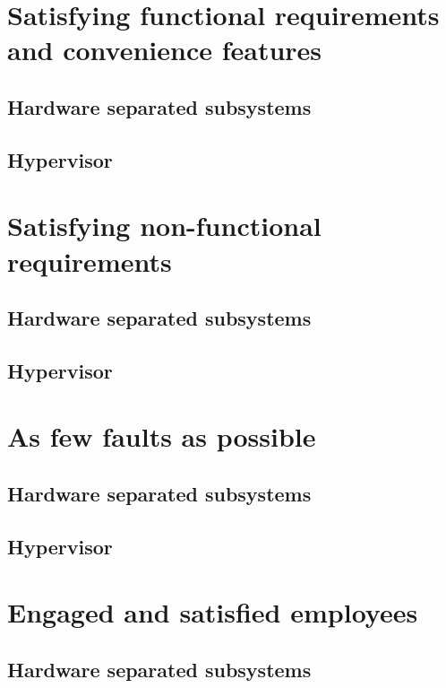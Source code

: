 \section{Satisfying functional requirements and convenience features}
\subsection{Hardware separated subsystems}
\subsection{Hypervisor}


\section{Satisfying non-functional requirements}
\subsection{Hardware separated subsystems}
\subsection{Hypervisor}


\section{As few faults as possible}
\subsection{Hardware separated subsystems}
\subsection{Hypervisor}


\section{Engaged and satisfied employees}
\subsection{Hardware separated subsystems}
